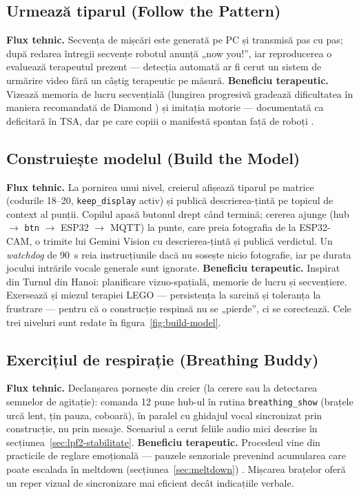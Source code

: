 \subsection*{Urmează tiparul (Follow the Pattern)}
\textbf{Flux tehnic.} Secvența de mișcări este generată pe PC și transmisă pas cu pas; după redarea întregii secvențe robotul anunță „now you!”, iar reproducerea o evaluează terapeutul prezent — detecția automată ar fi cerut un sistem de urmărire video fără un câștig terapeutic pe măsură.
\textbf{Beneficiu terapeutic.} Vizează memoria de lucru secvențială (lungirea progresivă gradează dificultatea în maniera recomandată de Diamond \cite{diamond2013}) și imitația motorie — documentată ca deficitară în TSA, dar pe care copiii o manifestă spontan față de roboți \cite{scassellati2012}.

\subsection*{Construiește modelul (Build the Model)}
\textbf{Flux tehnic.} La pornirea unui nivel, creierul afișează tiparul pe matrice (codurile 18--20, \texttt{keep\_display} activ) și publică descrierea-țintă pe topicul de context al punții. Copilul apasă butonul drept când termină; cererea ajunge (hub $\rightarrow$ \texttt{btn} $\rightarrow$ ESP32 $\rightarrow$ MQTT) la punte, care preia fotografia de la ESP32-CAM, o trimite lui Gemini Vision cu descrierea-țintă și publică verdictul. Un \emph{watchdog} de 90~s reia instrucțiunile dacă nu sosește nicio fotografie, iar pe durata jocului intrările vocale generale sunt ignorate.
\textbf{Beneficiu terapeutic.} Inspirat din Turnul din Hanoi: planificare vizuo-spațială, memorie de lucru și secvențiere. Exersează și miezul terapiei LEGO \cite{legoff2004} — persistența la sarcină și toleranța la frustrare — pentru că o construcție respinsă nu se „pierde”, ci se corectează. Cele trei niveluri sunt redate în figura~\ref{fig:build-model}.

\subsection*{Exercițiul de respirație (Breathing Buddy)}
\textbf{Flux tehnic.} Declanșarea pornește din creier (la cerere sau la detectarea semnelor de agitație): comanda 12 pune hub-ul în rutina \texttt{breathing\_show} (brațele urcă lent, țin pauza, coboară), în paralel cu ghidajul vocal sincronizat prin construcție, nu prin mesaje. Scenariul a cerut feliile audio mici descrise în secțiunea~\ref{sec:lpf2-stabilitate}.
\textbf{Beneficiu terapeutic.} Procedeul vine din practicile de reglare emoțională — pauzele senzoriale prevenind acumularea care poate escalada în meltdown (secțiunea~\ref{sec:meltdown}) \cite{mazefsky2013}. Mișcarea brațelor oferă un reper vizual de sincronizare mai eficient decât indicațiile verbale.

